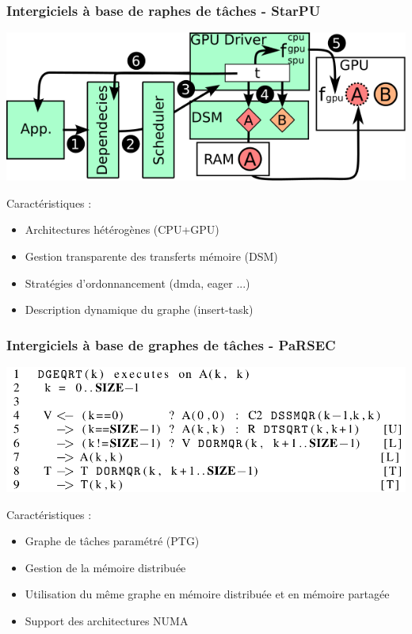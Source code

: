 \documentclass{beamer}
\begin{document}
\begin{frame}
  \frametitle{Intergiciels à base de raphes de tâches - StarPU}

  \centerline{\includegraphics[width=0.7\linewidth]{starpu}}

  Caractéristiques :
  \begin{itemize}
    \item Architectures hétérogènes (CPU+GPU)
    \item Gestion transparente des transferts mémoire (DSM)
    \item Stratégies d'ordonnancement (dmda, eager ...)
    \item Description dynamique du graphe (insert-task)
  \end{itemize}

\end{frame}


\begin{frame}
  \frametitle{Intergiciels à base de graphes de tâches - PaRSEC}

  \centerline{\includegraphics[width=0.8\linewidth]{parsec}}

  Caractéristiques :
  \begin{itemize}
    \item Graphe de tâches paramétré (PTG)
    \item Gestion de la mémoire distribuée
    \item Utilisation du même graphe en mémoire distribuée et en mémoire partagée
    \item Support des architectures NUMA
  \end{itemize}
\end{frame}
\end{document}
